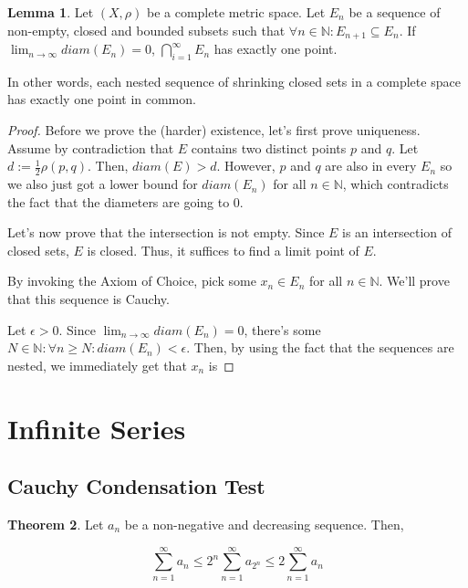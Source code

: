 \documentclass{article}
\theoremstyle{definition}
\newtheorem{theorem}{Theorem}[section]
\newtheorem{lemma}[theorem]{Lemma}
\newcommand{\N}{\mathbb{N}}
\begin{document}
\begin{lemma}
    Let $(X,\rho)$ be a complete metric space. Let $E_{n}$ be a sequence of non-empty,
    closed and bounded subsets such that $\forall n \in \N: E_{n+1} \subseteq E_{n}$.
    If $\lim_{n \to \infty} diam(E_{n}) = 0$, $\bigcap_{i = 1}^{\infty} E_{n}$
    has exactly one point.

    In other words, each nested sequence of shrinking closed
    sets in a complete space has exactly one point in common.
\end{lemma}
\begin{proof}
    Before we prove the (harder) existence, let's first prove uniqueness.
    Assume by contradiction that $E$ contains two distinct points $p$
    and $q$. Let $d := \frac{1}{2} \rho(p,q)$. Then, $diam(E) > d$.
    However, $p$ and $q$ are also in every $E_{n}$ so we also just
    got a lower bound for $diam(E_{n})$ for all $n \in \N$, which contradicts
    the fact that the diameters are going to 0.

    Let's now prove that the intersection is not empty. Since $E$
    is an intersection of closed sets, $E$ is closed. Thus, it suffices
    to find a limit point of $E$.

    By invoking the Axiom of Choice, pick some $x_{n} \in E_{n}$ for all
    $n \in \N$. We'll prove that this sequence is Cauchy. 
    
    Let $\epsilon > 0$.
    Since $\lim_{n \to \infty} diam(E_{n}) = 0$, there's some $N \in \N: \forall n \geq N:
    diam(E_{n}) < \epsilon$. Then, by using the fact that the sequences are nested, we immediately
    get that $x_{n}$ is 
\end{proof}

\newpage

\section{Infinite Series}

\subsection{Cauchy Condensation Test}

\begin{theorem}
    Let $a_{n}$ be a non-negative and decreasing sequence. Then,

    \[ \sum_{n=1}^{\infty} a_{n}\leq 2^{n} \sum_{n = 1}^{\infty} a_{2^{n}}\leq 2 \sum_{n=1}^{\infty} a_{n} \]
\end{theorem}
\end{document}

